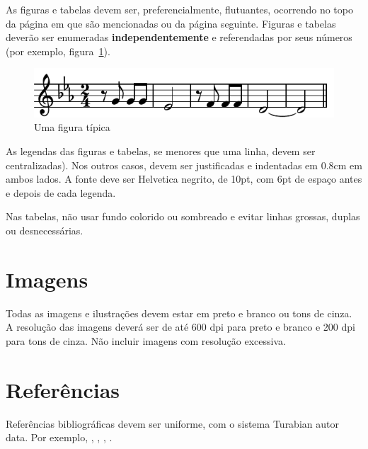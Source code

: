 \documentclass[12pt]{article}
\begin{document}
As figuras e tabelas devem ser, preferencialmente, flutuantes,
ocorrendo no topo da página em que são mencionadas ou da página
seguinte. Figuras e tabelas deverão ser enumeradas
\textbf{independentemente} e referendadas por seus números (por
exemplo, figura~\ref{fig:exampleFig}).

\begin{figure}
\centering
\includegraphics[width=.5\textwidth]{beethoven}
\caption{Uma figura típica}
\label{fig:exampleFig}
\end{figure}

As legendas das figuras e tabelas, se menores que uma linha, devem ser
centralizadas). Nos outros casos, devem ser justificadas e indentadas
em 0.8cm em ambos lados. A fonte deve ser Helvetica negrito, de 10pt,
com 6pt de espaço antes e depois de cada legenda.

Nas tabelas, não usar fundo colorido ou sombreado e evitar linhas
grossas, duplas ou desnecessárias.


\section{Imagens}

Todas as imagens e ilustrações devem estar em preto e branco ou tons
de cinza. A resolução das imagens deverá ser de até 600 dpi para preto
e branco e 200 dpi para tons de cinza. Não incluir imagens com
resolução excessiva.

\section{Referências}

Referências bibliográficas devem ser uniforme, com o sistema Turabian
autor data. Por exemplo, \cite{kroger04:desenvolvendo},
\cite{babbitt61:set}, \cite{coutinho.ea05:computational},
\cite{morris87:composition}.


\end{document}
